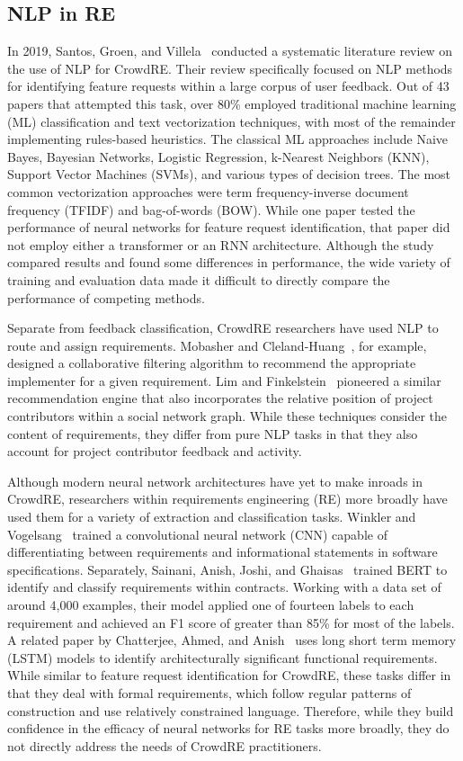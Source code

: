 \subsection{NLP in RE}
In 2019, Santos, Groen, and Villela~\cite{santos} conducted a systematic literature review on the use of NLP for CrowdRE. Their review specifically focused on NLP methods for identifying feature requests within a large corpus of user feedback. Out of 43 papers that attempted this task, over 80\% employed traditional machine learning (ML) classification and text vectorization techniques, with most of the remainder implementing rules-based heuristics. The classical ML approaches include Naive Bayes, Bayesian Networks, Logistic Regression, k-Nearest Neighbors (KNN), Support Vector Machines (SVMs), and various types of decision trees. The most common vectorization approaches were term frequency-inverse document frequency (TFIDF) and bag-of-words (BOW). While one paper tested the performance of neural networks for feature request identification, that paper did not employ either a transformer or an RNN architecture. Although the study compared results and found some differences in performance, the wide variety of training and evaluation data made it difficult to directly compare the performance of competing methods.

Separate from feedback classification, CrowdRE researchers have used NLP to route and assign requirements. Mobasher and Cleland-Huang~\cite{mobasher}, for example, designed a collaborative filtering algorithm to recommend the appropriate implementer for a given requirement. Lim and Finkelstein~\cite{stakerare} pioneered a similar recommendation engine that also incorporates the relative position of project contributors within a social network graph. While these techniques consider the content of requirements, they differ from pure NLP tasks in that they also account for project contributor feedback and activity.  

Although modern neural network architectures have yet to make inroads in CrowdRE, researchers within requirements engineering (RE) more broadly have used them for a variety of extraction and classification tasks. Winkler and Vogelsang~\cite{winkler} trained a convolutional neural network (CNN) capable of differentiating between requirements and informational statements in software specifications. Separately, Sainani, Anish, Joshi, and Ghaisas~\cite{sainani} trained BERT to identify and classify requirements within contracts. Working with a data set of around 4,000 examples, their model applied one of fourteen labels to each requirement and achieved an F1 score of greater than 85\% for most of the labels. A related paper by Chatterjee, Ahmed, and Anish~\cite{chatterjee} uses long short term memory (LSTM) models to identify architecturally significant functional requirements. While similar to feature request identification for CrowdRE, these tasks differ in that they deal with formal requirements, which follow regular patterns of construction and use relatively constrained language. Therefore, while they build confidence in the efficacy of neural networks for RE tasks more broadly, they do not directly address the needs of CrowdRE practitioners.

